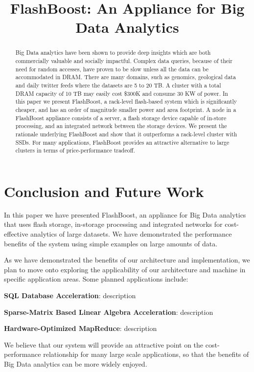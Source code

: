 \documentclass[pageno]{jpaper}
\begin{document}
\title{
FlashBoost: An Appliance for Big Data Analytics
}

\date{}
\maketitle


\begin{abstract}
Big Data analytics have been shown to provide deep insights which are both
commercially valuable and socially impactful. Complex data queries, because of
their need for random accesses, have proven to be slow unless all the data can
be accommodated in DRAM. There are many domains, such as genomics, geological
data and daily twitter feeds where the datasets are 5 to 20 TB. A cluster with a
total DRAM capacity of 10 TB may easily cost \$300K and consume 30
KW of power. In this paper we present FlashBoost, a rack-level
flash-based system which is significantly cheaper, and has an order of magnitude
smaller power and area footprint. A node in a FlashBoost appliance consists of a
server, a flash storage device capable of in-store processing, and an integrated
network between the storage devices. We present the rationale underlying
FlashBoost and show that it outperforms a rack-level cluster with SSDs. For many
applications, FlashBoost provides an attractive alternative to large clusters in
terms of price-performance tradeoff.
\end{abstract}



%









\section{Conclusion and Future Work}

In this paper we have presented FlashBoost, an appliance for Big Data analytics
that uses flash storage, in-storage processing and integrated networks for
cost-effective analytics of large datasets. We have demonstrated the performance
benefits of the system using simple examples on large amounts of data.

As we have demonstrated the benefits of our architecture and implementation, we
plan to move onto exploring the applicability of our architecture and machine in
specific application areas. Some planned applications include:

\textbf{SQL Database Acceleration}: description

\textbf{Sparse-Matrix Based Linear Algebra Acceleration}: description

\textbf{Hardware-Optimized MapReduce}: description

We believe that our system will provide an attractive point on the
cost-performance relationship for many large scale applications, so that the
benefits of Big Data analytics can be more widely enjoyed.





\end{document}
